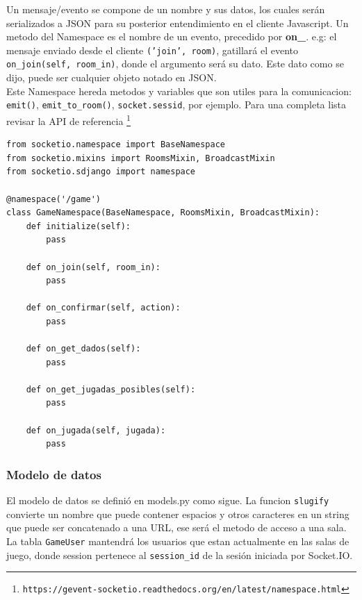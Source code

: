 \documentclass[a4paper,11pt]{article}
\begin{document}
Un mensaje/evento se compone de un nombre y sus datos, los cuales serán serializados a JSON
para su posterior entendimiento en el cliente Javascript. Un metodo del Namespace es el nombre de un evento, precedido por \textbf{on\_}. e.g: el mensaje enviado desde 
el cliente \texttt{('join', room)}, gatillará el evento \texttt{on\_join(self, room\_in)}, donde el argumento será su dato. Este dato como se dijo, puede ser cualquier objeto notado en JSON.\\

Este Namespace hereda metodos y variables que son utiles para la comunicacion: 
\texttt{emit()}, \texttt{emit\_to\_room()}, \texttt{socket.sessid}, por ejemplo. Para una completa lista revisar la API de referencia \footnote{\texttt{https://gevent-socketio.readthedocs.org/en/latest/namespace.html}}

\begin{lstlisting}[caption=cacho\_app/cacho\_socketio.py]
from socketio.namespace import BaseNamespace
from socketio.mixins import RoomsMixin, BroadcastMixin
from socketio.sdjango import namespace

@namespace('/game')
class GameNamespace(BaseNamespace, RoomsMixin, BroadcastMixin):
	def initialize(self):
		pass

	def on_join(self, room_in):
		pass

	def on_confirmar(self, action):
		pass
	
	def on_get_dados(self):
		pass

	def on_get_jugadas_posibles(self):
		pass

	def on_jugada(self, jugada):
		pass

\end{lstlisting}
\newpage
\subsubsection{Modelo de datos}
El modelo de datos se definió en models.py como sigue. La funcion \texttt{slugify} convierte un nombre
que puede contener espacios y otros caracteres en un string que puede ser concatenado a una URL, ese será
el metodo de acceso a una sala.\\

La tabla \texttt{GameUser} mantendrá los usuarios que estan actualmente en las salas de juego,
donde session pertenece al \texttt{session\_id} de la sesión iniciada por Socket.IO.
\end{document}
